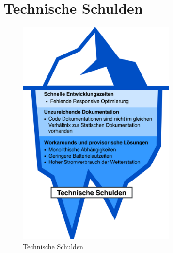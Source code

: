 \documentclass[
]{article}
\begin{document}
\section{Technische Schulden}
\begin{figure}[H]
	\centering
	\includegraphics[width=80mm]{resources/technischeSchulden.drawio.png}
	\caption{Technische Schulden}
	\label{fig:TechnischeSchulden}
\end{figure}  
\end{document}
